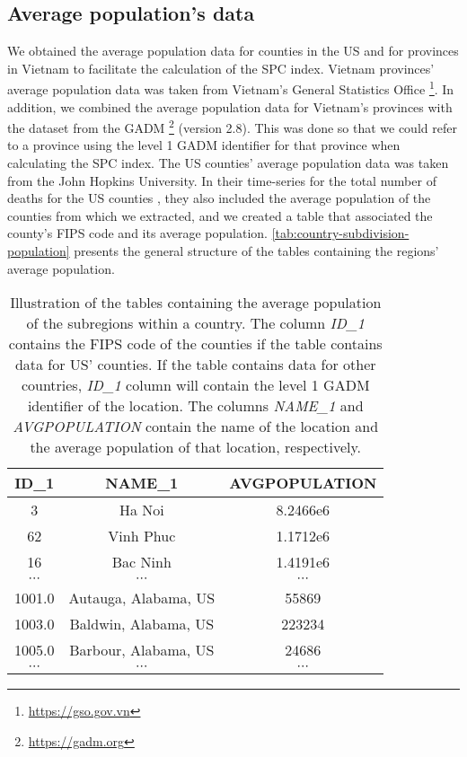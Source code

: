 \subsection{Average population's data}

We obtained the average population data for counties in the \gls{US} and for provinces in Vietnam to facilitate the calculation of the \gls{SPC} index.
Vietnam provinces' average population data was taken from Vietnam's General Statistics Office \footnote{\url{https://gso.gov.vn}}.
In addition, we combined the average population data for Vietnam's provinces with the dataset from the \gls{GADM} \footnote{\url{https://gadm.org}} (version 2.8).
This was done so that we could refer to a province using the level 1 \gls{GADM} identifier for that province when calculating the \gls{SPC} index.
The \gls{US} counties' average population data was taken from the John Hopkins University.
In their time-series for the total number of deaths for the \gls{US} counties \cite{dongInteractiveWebbasedDashboard2020}, they also included the average population of the counties from which we extracted, and we created a table that associated the county's \gls{FIPS} code and its average population.
\autoref{tab:country-subdivision-population} presents the general structure of the tables containing the regions' average population.

\begin{table}[h]
\centering
\begin{tabular}{| c | c | c |}
    ID\_1 & NAME\_1 & AVGPOPULATION \\
    \hline\hline
    3 & Ha Noi & 8.2466e6 \\
    \hline
    62 & Vinh Phuc & 1.1712e6 \\
    \hline
    16 & Bac Ninh & 1.4191e6 \\
    \hline
    $\cdots$ & $\cdots$ & $\cdots$ \\
    \hline
    1001.0 & Autauga, Alabama, US & 55869 \\
    \hline
    1003.0 & Baldwin, Alabama, US & 223234 \\
    \hline
    1005.0 & Barbour, Alabama, US & 24686 \\
    \hline
    $\cdots$ & $\cdots$ & $\cdots$ \\
\end{tabular}
\caption{Illustration of the tables containing the average population of the subregions within a country. The column \textit{ID\_1} contains the FIPS code of the counties if the table contains data for US' counties. If the table contains data for other countries, \textit{ID\_1} column will contain the level 1 GADM identifier of the location. The columns \textit{NAME\_1} and \textit{AVGPOPULATION} contain the name of the location and the average population of that location, respectively.}
\label{tab:country-subdivision-population}
\end{table}